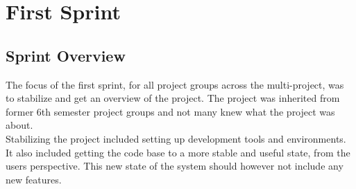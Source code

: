 \part{First Sprint}
\label{par:first_sprint}

\chapter{Sprint Overview}
The focus of the first sprint, for all project groups across the multi-project, was to stabilize and get an overview of the project. The project was inherited from former 6th semester project groups and not many knew what the \giraf project was about.
\\
Stabilizing the project included setting up development tools and environments. It also included getting the code base to a more stable and useful state, from the users perspective. This new state of the system should however not include any new features.









